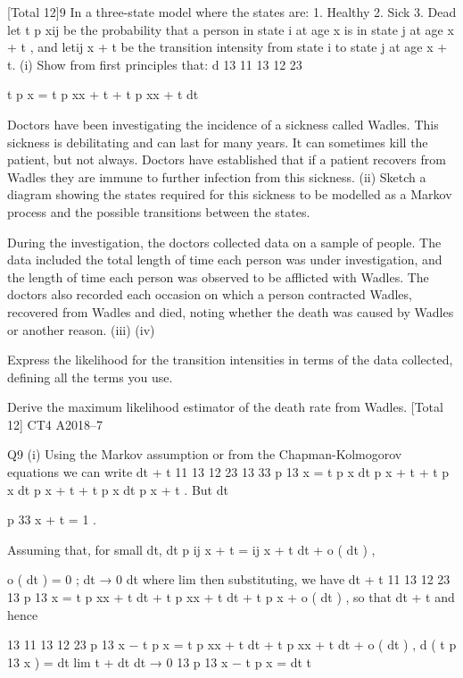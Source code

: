 \documentclass[a4paper,12pt]{article}
\begin{document}
[Total 12]9
In a three-state model where the states are:
1. Healthy
2. Sick
3. Dead
let t p xij be the probability that a person in state i at age x is in state j at age x + t ,
and let\mu ij x + t be the transition intensity from state i to state j at age x + t.
(i)
Show from first principles that:
d 13
11 13
12 23

t p x = t p x\mu x + t + t p x\mu x + t
dt

Doctors have been investigating the incidence of a sickness called Wadles. This
sickness is debilitating and can last for many years. It can sometimes kill the patient,
but not always. Doctors have established that if a patient recovers from Wadles they
are immune to further infection from this sickness.
(ii)
Sketch a diagram showing the states required for this sickness to be modelled
as a Markov process and the possible transitions between the states.

During the investigation, the doctors collected data on a sample of people. The data
included the total length of time each person was under investigation, and the length
of time each person was observed to be afflicted with Wadles. The doctors also
recorded each occasion on which a person contracted Wadles, recovered from Wadles
and died, noting whether the death was caused by Wadles or another reason.
(iii)
(iv)

Express the likelihood for the transition intensities in terms of the data
collected, defining all the terms you use.

Derive the maximum likelihood estimator of the death rate from Wadles. 
[Total 12]
CT4 A2018–7 





Q9
(i)
Using the Markov assumption or from the Chapman-Kolmogorov
equations we can write
dt + t 11
13
12
23
13
33
p 13
x = t p x dt p x + t + t p x dt p x + t + t p x dt p x + t .
But dt


p 33
x + t = 1 .

Assuming that, for small dt,
dt
p ij x + t =
\mu ij x + t dt + o ( dt ) ,

o ( dt )
= 0 ;
dt → 0 dt
where lim
then substituting, we have
dt + t
11 13
12 23
13
p 13
x = t p x\mu x + t dt + t p x\mu x + t dt + t p x + o ( dt ) ,
so that
dt + t
and hence

13
11 13
12 23
p 13
x − t p x = t p x\mu x + t dt + t p x\mu x + t dt + o ( dt ) ,
d
( t p 13
x ) =
dt
lim
t + dt
dt → 0
13
p 13
x − t p x
=
dt
t
\end{document}
